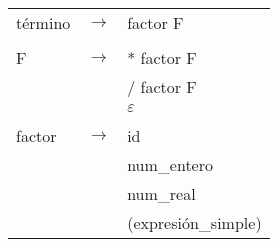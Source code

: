 \documentclass[11pt,twoside,a4paper]{book}
\begin{document}
\begin{tabular}{l c l}
t\'{e}rmino & $ \rightarrow $ & factor F \\
\\

F & $ \rightarrow $ & * factor F \\
                  & & / factor F \\
                  & & $ \varepsilon $ \\
\\

factor & $ \rightarrow $ & id \\
                    & & num\_entero \\
                    & & num\_real \\
                    & & (expresi\'{o}n\_simple)
\end{tabular}
\end{document}
